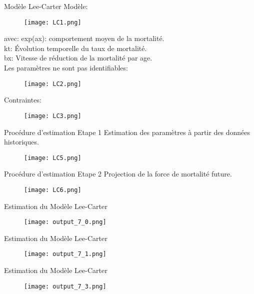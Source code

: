 \documentclass[11pt]{beamer}
\begin{document}
\begin{frame}{Modèle Lee-Carter}
Modèle:
\begin{figure}[!htb]
    \centering
    \texttt{[image: LC1.png]}
\end{figure}
avec: 
exp(ax): comportement moyen de la mortalité.
\\kt: Évolution temporelle du taux de mortalité.
\\bx: Vitesse de réduction de la mortalité par age.
\\Les paramètres ne sont pas identifiables:
\begin{figure}[!htb]
    \centering
    \texttt{[image: LC2.png]}
\end{figure}
Contraintes:
\begin{figure}[!htb]
    \centering
    \texttt{[image: LC3.png]}
\end{figure}
\end{frame}

\begin{frame}{Procédure d'estimation Etape 1}
Estimation des paramètres à partir des données historiques.
\begin{figure}[!htb]
    \centering
    \texttt{[image: LC5.png]}
\end{figure}
\end{frame}

\begin{frame}{Procédure d'estimation Etape 2}
Projection de la force de mortalité future.
\begin{figure}[!htb]
    \centering
    \texttt{[image: LC6.png]}
\end{figure}
\end{frame}


\begin{frame}{Estimation du Modèle Lee-Carter}
\begin{figure}[!htb]
    \centering
    \texttt{[image: output\_7\_0.png]}
\end{figure}
\end{frame}

\begin{frame}{Estimation du Modèle Lee-Carter}
\begin{figure}[!htb]
    \centering
    \texttt{[image: output\_7\_1.png]}
\end{figure}
\end{frame}

\begin{frame}{Estimation du Modèle Lee-Carter}
\begin{figure}[!htb]
    \centering
    \texttt{[image: output\_7\_3.png]}
\end{figure}
\end{frame}
\end{document}
